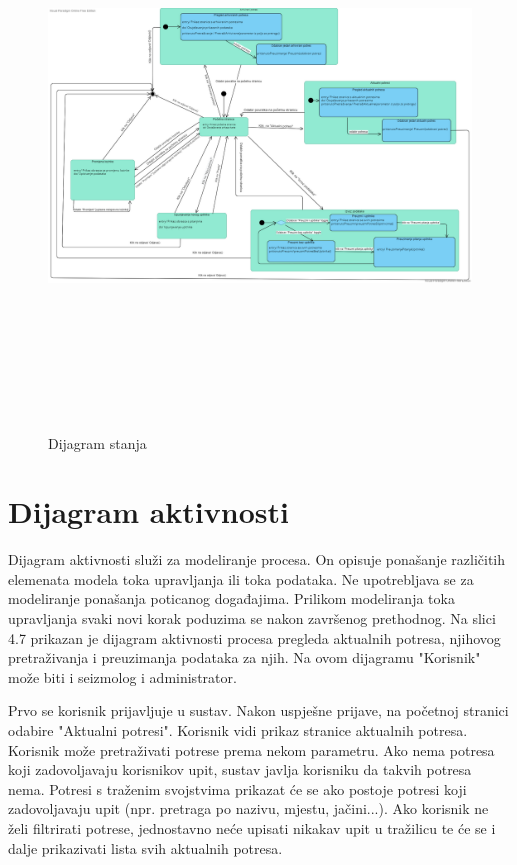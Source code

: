 			
			
		\begin{figure}[H]
            \includegraphics[width=\textwidth, height=15cm]{slike/dijagramstanja.png}
            \caption{Dijagram stanja}
            \label{fig:uml_db} 
        \end{figure}
			
			\eject 
		
		\section{Dijagram aktivnosti}
		
		Dijagram aktivnosti služi za modeliranje procesa. On opisuje ponašanje različitih elemenata modela toka upravljanja ili toka podataka. Ne upotrebljava se za modeliranje ponašanja poticanog događajima. Prilikom modeliranja toka upravljanja svaki novi korak poduzima se nakon završenog
		prethodnog. Na slici 4.7 prikazan je dijagram aktivnosti procesa pregleda aktualnih potresa, njihovog pretraživanja i preuzimanja podataka za njih. 
		Na ovom dijagramu "Korisnik" može biti i seizmolog i administrator.
		
		Prvo se korisnik prijavljuje u sustav. Nakon uspješne prijave, na početnoj stranici odabire "Aktualni potresi". Korisnik vidi prikaz stranice aktualnih potresa. Korisnik može pretraživati potrese prema nekom parametru. Ako nema potresa koji zadovoljavaju korisnikov upit, sustav javlja korisniku da takvih potresa nema. Potresi s traženim svojstvima prikazat će se ako postoje potresi koji zadovoljavaju upit (npr. pretraga po nazivu, mjestu, jačini...). Ako korisnik ne želi filtrirati potrese, jednostavno neće upisati nikakav upit u tražilicu te će se i dalje prikazivati lista svih aktualnih potresa.
		
